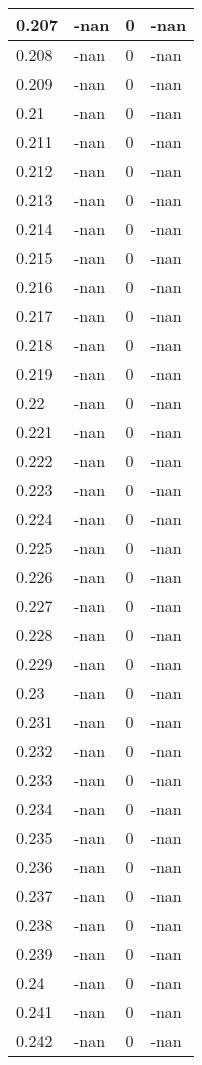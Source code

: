 \documentclass[a4paper,14pt]{extarticle}
\begin{document}
\begin{longtable}{||m{3cm}||m{3cm}|m{3cm}||m{3cm}||}
\hline
0.207 & -nan & 0 & -nan\\
\hline
0.208 & -nan & 0 & -nan\\
\hline
0.209 & -nan & 0 & -nan\\
\hline
0.21 & -nan & 0 & -nan\\
\hline
0.211 & -nan & 0 & -nan\\
\hline
0.212 & -nan & 0 & -nan\\
\hline
0.213 & -nan & 0 & -nan\\
\hline
0.214 & -nan & 0 & -nan\\
\hline
0.215 & -nan & 0 & -nan\\
\hline
0.216 & -nan & 0 & -nan\\
\hline
0.217 & -nan & 0 & -nan\\
\hline
0.218 & -nan & 0 & -nan\\
\hline
0.219 & -nan & 0 & -nan\\
\hline
0.22 & -nan & 0 & -nan\\
\hline
0.221 & -nan & 0 & -nan\\
\hline
0.222 & -nan & 0 & -nan\\
\hline
0.223 & -nan & 0 & -nan\\
\hline
0.224 & -nan & 0 & -nan\\
\hline
0.225 & -nan & 0 & -nan\\
\hline
0.226 & -nan & 0 & -nan\\
\hline
0.227 & -nan & 0 & -nan\\
\hline
0.228 & -nan & 0 & -nan\\
\hline
0.229 & -nan & 0 & -nan\\
\hline
0.23 & -nan & 0 & -nan\\
\hline
0.231 & -nan & 0 & -nan\\
\hline
0.232 & -nan & 0 & -nan\\
\hline
0.233 & -nan & 0 & -nan\\
\hline
0.234 & -nan & 0 & -nan\\
\hline
0.235 & -nan & 0 & -nan\\
\hline
0.236 & -nan & 0 & -nan\\
\hline
0.237 & -nan & 0 & -nan\\
\hline
0.238 & -nan & 0 & -nan\\
\hline
0.239 & -nan & 0 & -nan\\
\hline
0.24 & -nan & 0 & -nan\\
\hline
0.241 & -nan & 0 & -nan\\
\hline
0.242 & -nan & 0 & -nan\\

\end{longtable}
\end{document}
